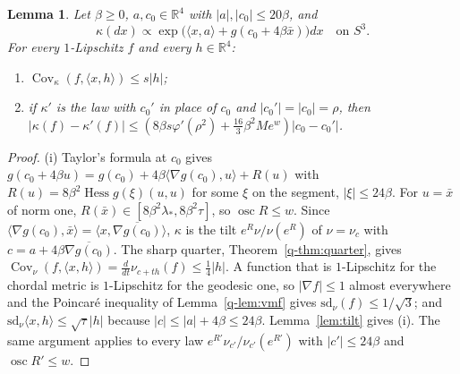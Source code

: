 \documentclass[aps,prd,twocolumn,superscriptaddress,nofootinbib,longbibliography,floatfix,amsmath,amssymb,10pt]{revtex4-2}
\newtheorem{lemma}[theorem]{Lemma}
\theoremstyle{definition}
\theoremstyle{remark}
\newcommand{\R}{\mathbb{R}}
\newcommand{\Hess}{\operatorname{Hess}}
\newcommand{\Cov}{\operatorname{Cov}}
\newcommand{\ip}[2]{\langle #1,#2\rangle}
\begin{document}
\begin{lemma}\label{lem:onesite}
Let $\beta\ge0$, $a,c_0\in\R^4$ with $|a|,|c_0|\le20\beta$, and
\[
\kappa(dx)\propto\exp\bigl(\ip xa+g(c_0+4\beta\bar x)\bigr)dx
\quad\text{on }S^3 .
\]
For every $1$-Lipschitz $f$ and every $h\in\R^4$:
\begin{enumerate}[label=\textup{(\roman*)},leftmargin=*]
\item $\Cov_\kappa(f,\ip xh)\le s|h|$;
\item if $\kappa'$ is the law with $c_0'$ in place of $c_0$ and
$|c_0'|=|c_0|=\rho$, then $|\kappa(f)-\kappa'(f)|\le(8\beta s\varphi'(\rho^2)
+\frac{16}3\beta^2Me^w)|c_0-c_0'|$.
\end{enumerate}
\end{lemma}

\begin{proof}
(i) Taylor's formula at $c_0$ gives $g(c_0+4\beta u)=g(c_0)+4\beta\ip{\nabla
g(c_0)}u+R(u)$ with $R(u)=8\beta^2\Hess g(\xi)(u,u)$ for some $\xi$ on the
segment, $|\xi|\le24\beta$. For $u=\bar x$ of norm one, $R(\bar x)\in[8\beta^2
\lambda_*,8\beta^2\tau]$, so $\operatorname{osc}R\le w$. Since $\ip{\nabla
g(c_0)}{\bar x}=\ip x{\overline{\nabla g(c_0)}}$, $\kappa$ is the tilt
$e^{R}\nu/\nu(e^R)$ of $\nu=\nu_c$ with $c=a+4\beta\overline{\nabla g(c_0)}$.
The sharp quarter, Theorem~\ref{q-thm:quarter}, gives $\Cov_\nu(f,\ip xh)=\frac{d}{dt}
\nu_{c+th}(f)\le\frac14|h|$. A function that is $1$-Lipschitz for the
chordal metric is $1$-Lipschitz for the geodesic one, so $|\nabla f|\le1$
almost everywhere and the Poincar\'e inequality of Lemma~\ref{q-lem:vmf}
gives $\mathrm{sd}_\nu(f)\le1/\sqrt3$; and $\mathrm{sd}_\nu\ip xh\le\sqrt\tau|h|$
because $|c|\le|a|+4\beta\le24\beta$. Lemma~\ref{lem:tilt} gives (i). The
same argument applies to every law $e^{R'}\nu_{c'}/\nu_{c'}(e^{R'})$ with
$|c'|\le24\beta$ and $\operatorname{osc}R'\le w$.


\end{proof}
\end{document}
